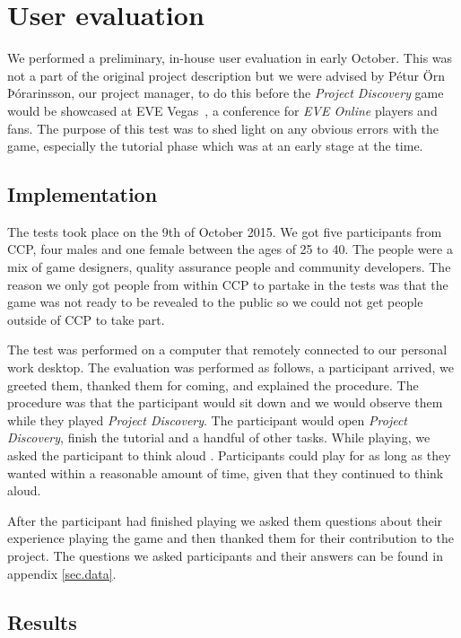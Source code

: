 \section{User evaluation}\label{sec:userevaluation}

We performed a preliminary, in-house user evaluation in early October. This was not a part of the original project description but we were advised by Pétur Örn Þórarinsson, our project manager, to do this before the \emph{Project Discovery} game would be showcased at EVE Vegas~\cite{vegas}, a conference for \emph{EVE Online} players and fans. The purpose of this test was to shed light on any obvious errors with the game, especially the tutorial phase which was at an early stage at the time.

\subsection{Implementation}
The tests took place on the 9th of October 2015. We got five participants from CCP, four males and one female between the ages of 25 to 40. The people were a mix of game designers, quality assurance people and community developers. The reason we only got people from within CCP to partake in the tests was that the game was not ready to be revealed to the public so we could not get people outside of CCP to take part.

The test was performed on a computer that remotely connected to our personal work desktop. The evaluation was performed as follows, a participant arrived, we greeted them, thanked them for coming, and explained the procedure. The procedure was that the participant would sit down and we would observe them while they played \emph{Project Discovery}. The participant would open \emph{Project Discovery}, finish the tutorial and a handful of other tasks. While playing, we asked the participant to think aloud . Participants could play for as long as they wanted within a reasonable amount of time, given that they continued to think aloud.

After the participant had finished playing we asked them questions about their experience playing the game and then thanked them for their contribution to the project. The questions we asked participants and their answers can be found in appendix \ref{sec.data}.

\subsection{Results}


